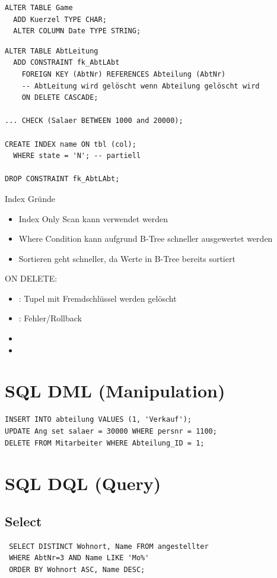 \begin{multicols*}{3}
\begin{verbatim}
ALTER TABLE Game
  ADD Kuerzel TYPE CHAR;
  ALTER COLUMN Date TYPE STRING;
\end{verbatim}

\begin{verbatim}
ALTER TABLE AbtLeitung
  ADD CONSTRAINT fk_AbtLAbt
    FOREIGN KEY (AbtNr) REFERENCES Abteilung (AbtNr)
    -- AbtLeitung wird gelöscht wenn Abteilung gelöscht wird
    ON DELETE CASCADE;

... CHECK (Salaer BETWEEN 1000 and 20000);

CREATE INDEX name ON tbl (col);
  WHERE state = 'N'; -- partiell

DROP CONSTRAINT fk_AbtLAbt;
\end{verbatim}

Index Gründe
\begin{itemize}
    \item Index Only Scan kann verwendet werden
    \item Where Condition kann aufgrund B-Tree schneller ausgewertet werden
    \item Sortieren geht schneller, da Werte in B-Tree bereits sortiert
\end{itemize}

ON DELETE:

\begin{itemize}
  \item {}: Tupel mit Fremdschlüssel werden gelöscht
  \item {}: Fehler/Rollback
  \item {}
  \item {}
\end{itemize}

\section{SQL DML (Manipulation)}
\begin{verbatim}
INSERT INTO abteilung VALUES (1, 'Verkauf');
UPDATE Ang set salaer = 30000 WHERE persnr = 1100;
DELETE FROM Mitarbeiter WHERE Abteilung_ID = 1;
\end{verbatim}

\section{SQL DQL (Query)}

\subsection{Select}
\begin{verbatim}
 SELECT DISTINCT Wohnort, Name FROM angestellter
 WHERE AbtNr=3 AND Name LIKE 'Mo%'
 ORDER BY Wohnort ASC, Name DESC;
\end{verbatim}


\end{multicols*}
